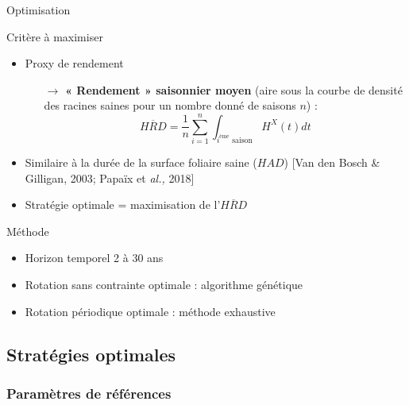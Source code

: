 \begin{frame}{Optimisation}
   \begin{block}{Critère à maximiser}
     \begin{itemize}
     \item Proxy de rendement
       \begin{itemize}
       
       \item[$\rightarrow$] \textbf{« Rendement » saisonnier moyen} (aire sous la courbe de densité des racines saines pour
un nombre donné de saisons $n$) : \\
       \begin{equation*}
  \overline{HRD}=\frac{1}{n} \sum_{i=1}^{n} \int_{i^{\text{ème}}\text{ saison}} H^{X}(t) dt
  \label{hr}
\end{equation*}
       \end{itemize}
              \item Similaire à la durée de la surface foliaire saine ($HAD$) \textcolor{shadecolor}{{\small[Van den Bosch \& Gilligan, 2003; Papaïx
et \textit{al.,} 2018]}}
     \item Stratégie optimale = maximisation de l'$\overline{HRD}$
     \end{itemize}
   \end{block}
   
   \begin{block}{Méthode}
        \begin{itemize}[itemsep=6pt]
     \item Horizon temporel 2 à 30 ans

     \item Rotation sans contrainte optimale : algorithme génétique
          
     \item Rotation périodique optimale :  méthode exhaustive  
     
       \end{itemize}
  \end{block}
   
 \end{frame}

\subsection{Stratégies optimales}
\subsubsection{Paramètres de références}
